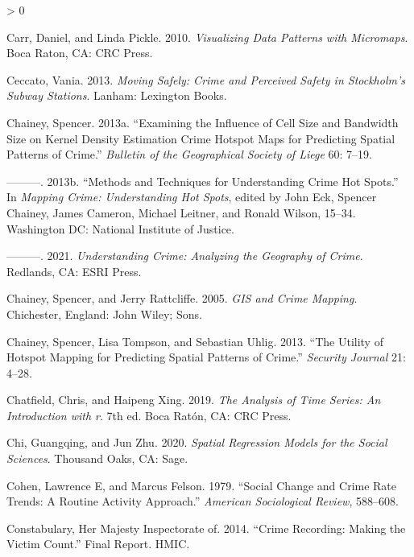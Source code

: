 \documentclass[
  krantz2]{krantz}
\newlength{\cslhangindent}
\newenvironment{CSLReferences}[2] %
 {%
  \setlength{\parindent}{0pt}
  \ifodd #1 \everypar{\setlength{\hangindent}{\cslhangindent}}\ignorespaces\fi
  \ifnum #2 > 0
  \setlength{\parskip}{#2\baselineskip}
  \fi
 }%
 {}
\begin{document}
\begin{CSLReferences}{1}{0}
\leavevmode\hypertarget{ref-Carr_2010}{}%
Carr, Daniel, and Linda Pickle. 2010. \emph{Visualizing Data Patterns with Micromaps}. Boca Raton, CA: CRC Press.

\leavevmode\hypertarget{ref-Ceccato_2013}{}%
Ceccato, Vania. 2013. \emph{Moving Safely: Crime and Perceived Safety in Stockholm's Subway Stations}. Lanham: Lexington Books.

\leavevmode\hypertarget{ref-Chainey_2013a}{}%
Chainey, Spencer. 2013a. {``Examining the Influence of Cell Size and Bandwidth Size on Kernel Density Estimation Crime Hotspot Maps for Predicting Spatial Patterns of Crime.''} \emph{Bulletin of the Geographical Society of Liege} 60: 7--19.

\leavevmode\hypertarget{ref-Chainey_2013b}{}%
---------. 2013b. {``Methods and Techniques for Understanding Crime Hot Spots.''} In \emph{Mapping Crime: Understanding Hot Spots}, edited by John Eck, Spencer Chainey, James Cameron, Michael Leitner, and Ronald Wilson, 15--34. Washington DC: National Institute of Justice.

\leavevmode\hypertarget{ref-Chainey_2021}{}%
---------. 2021. \emph{Understanding Crime: Analyzing the Geography of Crime}. Redlands, CA: ESRI Press.

\leavevmode\hypertarget{ref-Chainey_2005}{}%
Chainey, Spencer, and Jerry Rattcliffe. 2005. \emph{GIS and Crime Mapping}. Chichester, England: John Wiley; Sons.

\leavevmode\hypertarget{ref-Chainey_2008}{}%
Chainey, Spencer, Lisa Tompson, and Sebastian Uhlig. 2013. {``The Utility of Hotspot Mapping for Predicting Spatial Patterns of Crime.''} \emph{Security Journal} 21: 4--28.

\leavevmode\hypertarget{ref-Chatfield_2019}{}%
Chatfield, Chris, and Haipeng Xing. 2019. \emph{The Analysis of Time Series: An Introduction with r}. 7th ed. Boca Ratón, CA: CRC Press.

\leavevmode\hypertarget{ref-Chi_2020}{}%
Chi, Guangqing, and Jun Zhu. 2020. \emph{Spatial Regression Models for the Social Sciences}. Thousand Oaks, CA: Sage.

\leavevmode\hypertarget{ref-Cohen_1979}{}%
Cohen, Lawrence E, and Marcus Felson. 1979. {``Social Change and Crime Rate Trends: A Routine Activity Approach.''} \emph{American Sociological Review}, 588--608.

\leavevmode\hypertarget{ref-HMIC_2014}{}%
Constabulary, Her Majesty Inspectorate of. 2014. {``Crime Recording: Making the Victim Count.''} Final Report. HMIC.


\end{CSLReferences}
\end{document}
